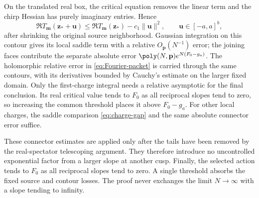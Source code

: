 On the translated real box, the critical equation removes the linear
term and the chirp Hessian has purely imaginary entries. Hence
\[
 \Re T_{\mathbf m}(\mathbf z_*+\mathbf u)
 \le\Re T_{\mathbf m}(\mathbf z_*)-c_1\|\mathbf u\|^2,
 \qquad \mathbf u\in[-a,a]^b,
\]
after shrinking the original source neighborhood. Gaussian integration
on this contour gives its local saddle term with a relative
$O_{\mathbf p}(N^{-1})$ error; the joining faces contribute the separate
absolute error $\poly(N,\mathbf p)e^{N(F_0-g_a)}$. The holomorphic
relative error in \eqref{eq:Fourier-packet} is carried through the same
contours, with its derivatives bounded by Cauchy's estimate on the
larger fixed domain. Only the first-charge integral needs a relative
asymptotic for the final conclusion. Its real critical value tends to
$F_0$ as all reciprocal slopes tend to zero, so increasing the common
threshold places it above $F_0-g_a$. For other local charges, the
saddle comparison \eqref{eq:charge-gap} and the same absolute connector
error suffice.

These connector estimates are applied only after the tails have been removed by the real-spectator telescoping argument. They therefore introduce no uncontrolled exponential factor from a larger slope at another cusp. Finally, the selected action tends to $F_0$ as all reciprocal slopes tend to zero. A single threshold absorbs the fixed source and contour losses. The proof never exchanges the limit $N\to\infty$ with a slope tending to infinity.
